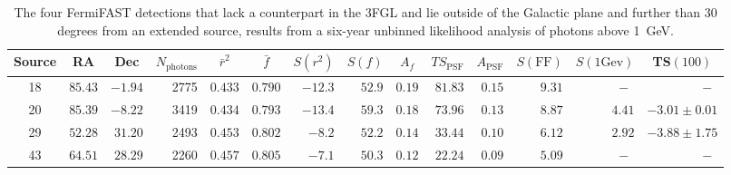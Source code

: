 \documentclass[useAMS,usenatbib]{mn2e}
\begin{document}
\begin{table}
  \caption{The four FermiFAST detections that lack a
    counterpart in the 3FGL and lie outside of the Galactic plane and
    further than 30 degrees from an extended source, results from a
    six-year unbinned likelihood analysis of photons above 1~GeV.}
  \label{tab:fermisig1GeV}
\begin{tabular}{crrrrrrrrrrrrr}
    \hline
    Source & \multicolumn{1}{c}{RA} & \multicolumn{1}{c}{Dec}  & \multicolumn{1}{c}{$N_\mathrm{photons}$}  &\multicolumn{1}{c}{$\bar r^2$} & \multicolumn{1}{c}{$\bar f$} & \multicolumn{1}{c}{$S(r^2)$} & \multicolumn{1}{c}{$S(f)$} & \multicolumn{1}{c}{$A_f$} & \multicolumn{1}{c}{$TS_\mathrm{PSF}$} & \multicolumn{1}{c}{$A_\mathrm{PSF}$} & \multicolumn{1}{c}{$S(\mathrm{FF})$} & \multicolumn{1}{c}{$S(\mathrm{1Gev})$}  & \multicolumn{1}{c}{TS$(100)$} 
 \\
    \hline
   18  & $ 85.43$ & $ -1.94$ &   2775 & $0.433$ & $0.790$ & $ -12.3$ & $  52.9$ & $0.19$ & $    81.83$ & $0.15$ & $     9.31$ & $~-~$    & $~-~$\\ 
   20  & $ 85.39$ & $ -8.22$ &   3419 & $0.434$ & $0.793$ & $ -13.4$ & $  59.3$ & $0.18$ & $    73.96$ & $0.13$ & $     8.87$ & $4.41$ & $-3.01\pm0.01$ \\
   29  & $ 52.28$ & $ 31.20$ &   2493 & $0.453$ & $0.802$ & $  -8.2$ & $  52.2$ & $0.14$ & $    33.44$ & $0.10$ & $     6.12$ & $2.92$ & $-3.88\pm1.75$ \\
   43  & $ 64.51$ & $ 28.29$ &   2260 & $0.457$ & $0.805$ & $  -7.1$ & $  50.3$ & $0.12$ & $    22.24$ & $0.09$ & $     5.09$ & $~-~$    & $~-~$ \\ 
\end{tabular}
\end{table}


\end{document}
